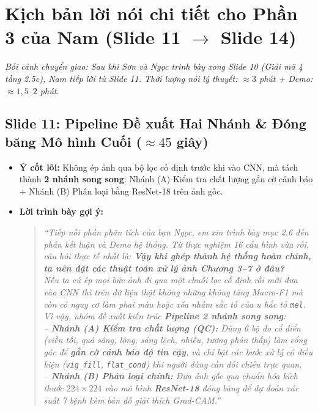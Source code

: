 \documentclass[11pt,a4paper]{article}
\begin{document}
\section{Kịch bản lời nói chi tiết cho Phần 3 của Nam (Slide 11 $\rightarrow$ Slide 14)}

\noindent\emph{Bối cảnh chuyển giao: Sau khi Sơn và Ngọc trình bày xong Slide 10 (Giải mã 4 tầng 2.5c), Nam tiếp lời từ Slide 11. Thời lượng nói lý thuyết: $\approx 3$ phút + Demo: $\approx 1{,}5\text{--}2$ phút.}

\subsection*{Slide 11: Pipeline Đề xuất Hai Nhánh \& Đóng băng Mô hình Cuối ($\approx 45$ giây)}
\begin{itemize}
    \item \textbf{Ý cốt lõi:} Không ép ảnh qua bộ lọc cố định trước khi vào CNN, mà tách thành \textbf{2 nhánh song song}: Nhánh (A) Kiểm tra chất lượng gắn cờ cảnh báo + Nhánh (B) Phân loại bằng ResNet-18 trên ảnh gốc.
    \item \textbf{Lời trình bày gợi ý:}
    \begin{quote}
    \emph{``Tiếp nối phần phân tích của bạn Ngọc, em xin trình bày mục 2.6 đến phần kết luận và Demo hệ thống. Từ thực nghiệm 16 cấu hình vừa rồi, câu hỏi thực tế nhất là: \textbf{Vậy khi ghép thành hệ thống hoàn chỉnh, ta nên đặt các thuật toán xử lý ảnh Chương 3--7 ở đâu?}\\
    Nếu ta cứ ép mọi bức ảnh đi qua một chuỗi lọc cố định rồi mới đưa vào CNN thì trên dữ liệu thật không những không tăng Macro-F1 mà còn có nguy cơ làm phai màu hoặc xóa nhầm sắc tố của u hắc tố \texttt{mel}.\\
    Vì vậy, nhóm đề xuất kiến trúc \textbf{Pipeline 2 nhánh song song}:\\
    -- \textbf{Nhánh (A) Kiểm tra chất lượng (QC):} Dùng 6 bộ đo cổ điển (viền tối, quá sáng, lông, sáng lệch, nhiễu, tương phản thấp) làm cổng gác để \textbf{gắn cờ cảnh báo độ tin cậy}, và chỉ bật các bước xử lý có điều kiện (\texttt{vig\_fill}, \texttt{flat\_cond}) khi người dùng cần đối chiếu trực quan.\\
    -- \textbf{Nhánh (B) Phân loại chính:} Đưa ảnh gốc qua chuẩn hóa kích thước $224\times 224$ vào mô hình \textbf{ResNet-18} đóng băng để dự đoán xác suất 7 bệnh kèm bản đồ giải thích Grad-CAM.''}
    \end{quote}
\end{itemize}
\end{document}
